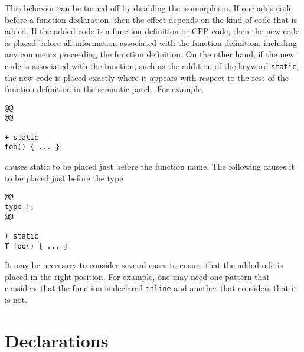 \noindent
This behavior can be turned off by disabling the 
isomorphism.  If one adds code before a function declaration, then the
effect depends on the kind of code that is added.  If the added code is a
function definition or CPP code, then the new code is placed before
all information associated with the function definition, including any
comments preceeding the function definition.  On the other hand, if the new
code is associated with the function, such as the addition of the keyword
{\tt static}, the new code is placed exactly where it appears with respect
to the rest of the function definition in the semantic patch.  For example, 

\begin{lstlisting}[language=Cocci]
@@
@@

+ static
foo() { ... }
\end{lstlisting}

\noindent
causes static to be placed just before the function name.  The following
causes it to be placed just before the type

\begin{lstlisting}[language=Cocci]
@@
type T;
@@

+ static
T foo() { ... }
\end{lstlisting}

\noindent
It may be necessary to consider several cases to ensure that the added ode
is placed in the right position.  For example, one may need one pattern
that considers that the function is declared {\tt inline} and another that
considers that it is not.


\section{Declarations}

